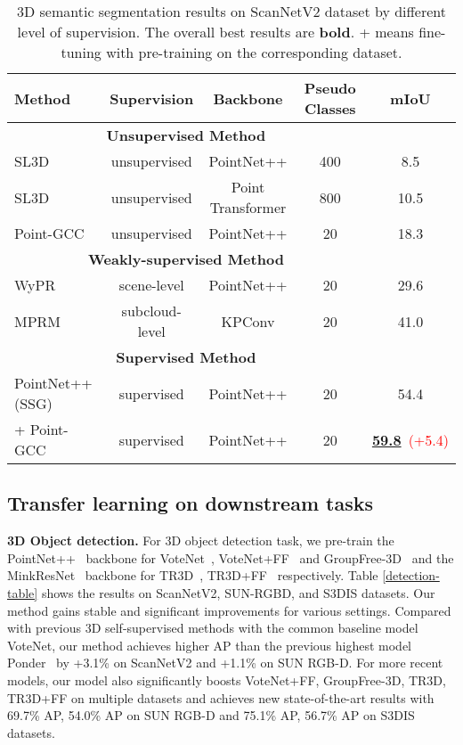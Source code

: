 \documentclass{article}
\begin{document}
\begin{table}
\centering
\resizebox{0.85\linewidth}{!}
{
 \begin{tabular}{lcccc}
    \toprule
    Method & Supervision & Backbone & Pseudo Classes & mIoU \\
    \midrule
    \multicolumn{4}{c}{\textbf{Unsupervised Method}} \\
    \midrule
    SL3D~\cite{SL3D} & unsupervised & PointNet++ & 400 & 8.5 \\
    SL3D~\cite{SL3D} & unsupervised & Point Transformer & 800 & 10.5 \\
    \rowcolor{linecolor2}Point-GCC & unsupervised & PointNet++ & 20 & 18.3 \\
    \midrule
    \multicolumn{4}{c}{\textbf{Weakly-supervised Method}} \\
    \midrule
    WyPR~\cite{WYPR} & scene-level & PointNet++ & 20 & 29.6 \\
    MPRM~\cite{MPRM} & subcloud-level & KPConv & 20 & 41.0 \\
    \midrule
    \multicolumn{4}{c}{\textbf{Supervised Method}} \\
    \midrule
    PointNet++(SSG)~\cite{PointNet++} & supervised & PointNet++ & 20 & 54.4 \\
    \rowcolor{linecolor2}+ Point-GCC & supervised & PointNet++ & 20 & \textbf{\underline{59.8}}~\tiny{\textcolor{red}{(+5.4)}} \\
    \bottomrule
  \end{tabular}
}
    \vspace{-0.2cm}
    \caption{3D semantic segmentation results on ScanNetV2 dataset by different level of supervision. The overall best results are \textbf{bold}. + means fine-tuning with pre-training on the corresponding dataset.}
  \label{semantic-table}
\end{table}
\subsection{Transfer learning on downstream tasks}
\label{downstream}
\vspace{-0.25cm}
\textbf{3D Object detection.} For 3D object detection task, we pre-train the PointNet++~\cite{PointNet++} backbone for VoteNet~\cite{VoteNet}, VoteNet+FF~\cite{TR3D} and GroupFree-3D~\cite{GroupFree} and the MinkResNet~\cite{MinkowskiEngine} backbone for TR3D~\cite{TR3D}, TR3D+FF~\cite{TR3D} respectively.
Table \ref{detection-table} shows the results on ScanNetV2, SUN-RGBD, and S3DIS datasets. Our method gains stable and significant improvements for various settings. Compared with previous 3D self-supervised methods with the common baseline model VoteNet, our method achieves higher AP than the previous highest model Ponder~\cite{Ponder} by +3.1\% on ScanNetV2 and +1.1\% on SUN RGB-D. For more recent models, our model also significantly boosts VoteNet+FF, GroupFree-3D, TR3D, TR3D+FF on multiple datasets and achieves new state-of-the-art results with 69.7\% AP, 54.0\% AP on SUN RGB-D and 75.1\% AP, 56.7\% AP on S3DIS datasets.
\end{document}
